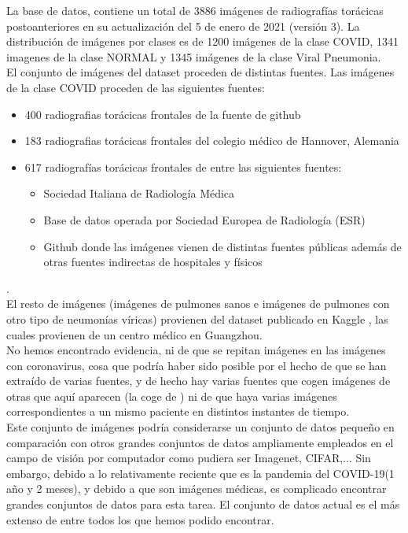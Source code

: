 \documentclass[11pt,a4paper]{article}
\theoremstyle{definition}
\begin{document}
La base de datos, contiene un total de 3886 imágenes de radiografías torácicas postoanteriores en su actualización del 5 de enero de 2021 (versión 3). La distribución de imágenes por clases es de 1200 imágenes de la clase COVID, 1341 imagenes de la clase NORMAL y 1345 imágenes de la clase Viral Pneumonia.\\

El conjunto de imágenes del dataset proceden de distintas fuentes. Las imágenes de la clase COVID proceden de las siguientes fuentes:
\begin{itemize}
\item 400 radiografias torácicas frontales de la fuente de github \cite{ref1}
\item 183  radiografias torácicas frontales del colegio médico de Hannover, Alemania \cite{ref2}
\item 617 radiografías torácicas frontales de entre las siguientes fuentes:
\begin{itemize}
\item Sociedad Italiana de Radiología Médica \cite{ref3}

\item Base de datos operada por Sociedad Europea de Radiología (ESR) \cite{ref4}

\item Github donde las imágenes vienen de distintas fuentes públicas además de otras fuentes indirectas de hospitales y físicos \cite{ref5}
\end{itemize}
\end{itemize}.\\

El resto de imágenes (imágenes de pulmones sanos e imágenes de pulmones con otro tipo de neumonías víricas) provienen del dataset publicado en Kaggle \cite{ref6}, las cuales provienen de un centro médico en Guangzhou.\\

No hemos encontrado evidencia,  ni de que se repitan imágenes en las imágenes con coronavirus,  cosa que podría haber sido posible por el hecho de que se han extraído de varias fuentes,  y de hecho hay varias fuentes que cogen imágenes de otras que aquí aparecen (la \cite{ref1} coge de  \cite{ref3}) ni de que haya varias imágenes correspondientes a un mismo paciente en distintos instantes de tiempo. \\

Este conjunto de imágenes podría considerarse un conjunto de datos pequeño en comparación con otros grandes conjuntos de datos ampliamente empleados en el campo de visión por computador como pudiera ser Imagenet, CIFAR,...  Sin embargo, debido a lo relativamente reciente que es la pandemia del COVID-19(1 año y 2 meses),  y debido a que son imágenes médicas, es complicado encontrar grandes conjuntos de datos para esta tarea. El conjunto de datos actual es el más extenso de entre todos los que hemos podido encontrar.
\end{document}
